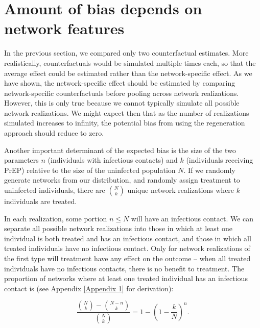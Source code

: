 \documentclass{article}
\theoremstyle{definition}
\begin{document}
\section{Amount of bias depends on network features}
In the previous section, we compared only two counterfactual estimates. More realistically, counterfactuals would be simulated multiple times each, so that the average effect could be estimated rather than the network-specific effect. As we have shown, the network-specific effect should be estimated by comparing network-specific counterfactuals before pooling across network realizations. However, this is only true because we cannot typically simulate all possible network realizations. We might expect then that as the number of realizations simulated increases to infinity, the potential bias from using the regeneration approach should reduce to zero.

Another important determinant of the expected bias is the size of the two parameters $n$ (individuals with infectious contacts) and $k$ (individuals receiving PrEP) relative to the size of the uninfected population $N$. If we randomly generate networks from our distribution, and randomly assign treatment to uninfected individuals, there are $\binom{N}{k}$ unique network realizations where $k$ individuals are treated. 

In each realization, some portion $n \le N$ will have an infectious contact. We can separate all possible network realizations into those in which at least one individual is both treated and has an infectious contact, and those in which all treated individuals have no infectious contact. Only for network realizations of the first type will treatment have any effect on the outcome -- when all treated individuals have no infectious contacts, there is no benefit to treatment. The proportion of networks where at least one treated individual has an infectious contact is (see Appendix \ref{Appendix 1} for derivation):

\begin{equation}\label{eq:17}
    \frac{{\binom{N}{k}}-{\binom{N-n}{k}}}{{\binom{N}{k}}}=1-\left(1-\frac{k}{N}\right)^{n}.
\end{equation}
\end{document}

